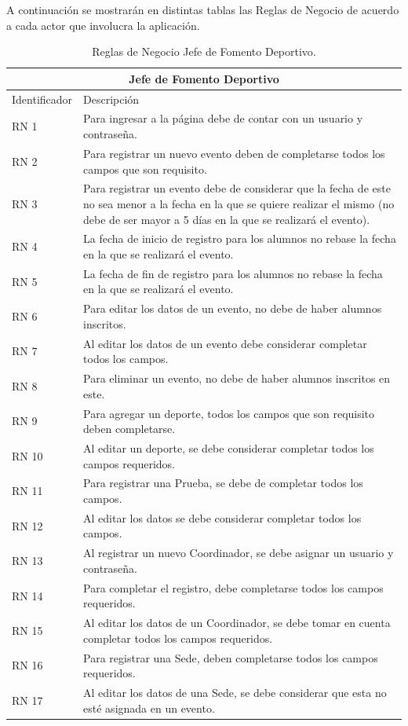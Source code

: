 \noindent A continuación se mostrarán en distintas tablas las Reglas de Negocio de acuerdo a cada actor que involucra la aplicación.

\begin{table}[hbt!]
	\begin{center}
		\begin{tabular}{|p{30mm}|p{100mm}|}
			\hline
			\multicolumn{2}{|c|}{Jefe de Fomento Deportivo} \\
			\hline
			Identificador & Descripción \\
			\hline 
			RN 1 & Para ingresar a la página debe de contar con un usuario y contraseña. \\ \hline
			RN 2 &  Para registrar un nuevo evento deben de completarse todos los campos que son requisito.\\ \hline
			RN 3 & Para registrar un evento debe de considerar que la fecha de este no sea menor a la fecha en la que se quiere realizar el mismo (no debe de ser mayor  a 5 días en la que se realizará el evento). \\ \hline
			RN 4 &  La fecha de inicio de registro para los alumnos no rebase la fecha en la que se realizará el evento.\\ \hline
			RN 5 &  La fecha de fin de registro para los alumnos no rebase la fecha en la que se realizará el evento. \\ \hline
			RN 6 & Para editar los datos de un evento, no debe de haber alumnos inscritos. \\ \hline
			RN 7 &  Al editar los datos de un evento debe considerar completar todos los campos.\\ \hline
			RN 8 &  Para eliminar un evento, no debe de haber alumnos inscritos en este.\\ \hline
			RN 9 &  Para agregar un deporte, todos los campos que son requisito deben completarse.\\ \hline
			RN 10 &  Al editar un deporte, se debe considerar completar todos los campos requeridos.\\ \hline
			RN 11 &  Para registrar una Prueba, se debe de completar todos los campos.\\ \hline
			RN 12 & Al editar los datos se debe considerar completar todos los campos.\\ \hline
			RN 13 &  Al registrar un nuevo Coordinador, se debe asignar un usuario y contraseña.\\ \hline
			RN 14 &  Para completar el registro, debe completarse todos los campos requeridos.\\ \hline
			RN 15 &  Al editar los datos de un Coordinador, se debe tomar en cuenta completar todos los campos requeridos.\\ \hline
			RN 16 &  Para registrar una Sede, deben completarse todos los campos requeridos.\\ \hline
			RN 17 &  Al editar los datos de una Sede, se debe considerar que esta no esté asignada en un evento.\\ \hline
		\end{tabular}
		\caption{Reglas de Negocio Jefe de Fomento Deportivo.}
		\label{RNJFD}
	\end{center}
\end{table}

